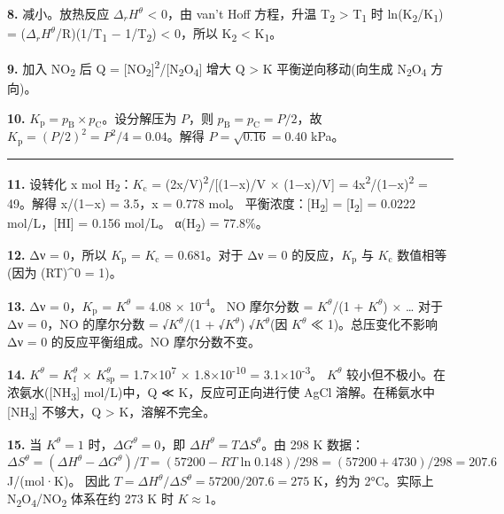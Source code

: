 \textbf{8.} 减小。放热反应 \(\Delta_r H^\theta\) \textless{} 0，由 van't Hoff 方程，升温 T\textsubscript{2} \textgreater{} T\textsubscript{1} 时 ln(K\textsubscript{2}/K\textsubscript{1}) = (\(\Delta_r H^\theta\)/R)(1/T\textsubscript{1} − 1/T\textsubscript{2}) \textless{} 0，所以 K\textsubscript{2} \textless{} K\textsubscript{1}。

\textbf{9.} 加入 NO\textsubscript{2} 后 Q = {[}NO\textsubscript{2}{]}\textsuperscript{2}/{[}N\textsubscript{2}O\textsubscript{4}{]} 增大 \箭 Q \textgreater{} K \箭 平衡逆向移动(向生成 N\textsubscript{2}O\textsubscript{4} 方向)。

\textbf{10.} \(K_{\mathrm p} = p_{\mathrm B} \times p_{\mathrm C}\)。设分解压为 \(P\)，则 \(p_{\mathrm B} = p_{\mathrm C} = P/2\)，故 \(K_{\mathrm p} = (P/2)^2 = P^2/4 = 0.04\)。解得 \(P = \sqrt{0.16} = 0.40\) kPa。

\begin{center}\rule{0.5\linewidth}{0.5pt}\end{center}

\textbf{11.} 设转化 x mol H\textsubscript{2}：\(K_{\mathrm c}\) = (2x/V)\textsuperscript{2}/{[}(1−x)/V × (1−x)/V{]} = 4x\textsuperscript{2}/(1−x)\textsuperscript{2} = 49。解得 x/(1−x) = 3.5，x = 0.778 mol。
平衡浓度：{[}H\textsubscript{2}{]} = {[}I\textsubscript{2}{]} = 0.0222 mol/L，{[}HI{]} = 0.156 mol/L。
α(H\textsubscript{2}) = 77.8\%。

\textbf{12.} Δν = 0，所以 \(K_{\mathrm p}\) = \(K_{\mathrm c}\) = 0.681。对于 Δν = 0 的反应，\(K_{\mathrm p}\) 与 \(K_{\mathrm c}\) 数值相等(因为 (RT)\^{}0 = 1)。

\textbf{13.} Δν = 0，\(K_{\mathrm p}\) = \(K^\theta\) = 4.08 × 10\textsuperscript{-4}。
NO 摩尔分数 = \(K^\theta\)/(1 + \(K^\theta\)) × \ldots{} 对于 Δν = 0，NO 的摩尔分数 = √\(K^\theta\)/(1 + √\(K^\theta\))  √\(K^\theta\)(因 \(K^\theta\) ≪ 1)。总压变化不影响 Δν = 0 的反应平衡组成。NO 摩尔分数不变。

\textbf{14.} \(K^\theta\) = \(K_{\mathrm f}^\theta\) × \(K_{\mathrm{sp}}^\theta\) = 1.7×10\textsuperscript{7} × 1.8×10\textsuperscript{-10} = 3.1×10\textsuperscript{-3}。
\(K^\theta\) 较小但不极小。在浓氨水({[}NH\textsubscript{3}{]}  mol/L)中，Q ≪ K，反应可正向进行使 AgCl 溶解。在稀氨水中 {[}NH\textsubscript{3}{]} 不够大，Q \textgreater{} K，溶解不完全。

\textbf{15.} 当 \(K^\theta = 1\) 时，\(\Delta G^\theta = 0\)，即 \(\Delta H^\theta = T\Delta S^\theta\)。由 298 K 数据：
\(\Delta S^\theta = (\Delta H^\theta - \Delta G^\theta)/T = (57200 - RT\ln 0.148)/298 = (57200 + 4730)/298 = 207.6\) J/(mol·K)。
因此 \(T = \Delta H^\theta/\Delta S^\theta = 57200/207.6 = 275\) K，约为 2°C。实际上 N\textsubscript{2}O\textsubscript{4}/NO\textsubscript{2} 体系在约 273 K 时 \(K \approx 1\)。

